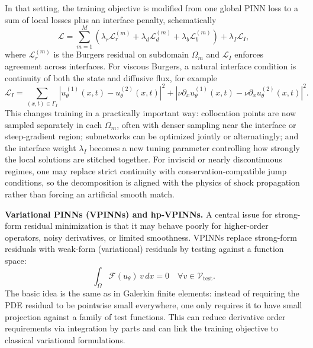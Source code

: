 \documentclass[11pt]{article}
\begin{document}
    In that setting, the training objective is modified from one global PINN loss to a sum of local losses plus an interface penalty, schematically
    \begin{equation}
    \mathcal{L} = \sum_{m=1}^{M}\left(\lambda_r \mathcal{L}_{r}^{(m)} + \lambda_d \mathcal{L}_{d}^{(m)} + \lambda_b \mathcal{L}_{b}^{(m)}\right) + \lambda_I \mathcal{L}_{I},
    \end{equation}
    where $\mathcal{L}_{r}^{(m)}$ is the Burgers residual on subdomain $\Omega_m$ and $\mathcal{L}_{I}$ enforces agreement across interfaces. For viscous Burgers, a natural interface condition is continuity of both the state and diffusive flux, for example
    \begin{equation}
    \mathcal{L}_{I} = \sum_{(x,t)\in \Gamma_I} \left|u_{\theta}^{(1)}(x,t)-u_{\theta}^{(2)}(x,t)\right|^2
    + \left|\nu \partial_x u_{\theta}^{(1)}(x,t)-\nu \partial_x u_{\theta}^{(2)}(x,t)\right|^2.
    \end{equation}
    This changes training in a practically important way: collocation points are now sampled separately in each $\Omega_m$, often with denser sampling near the interface or steep-gradient region; subnetworks can be optimized jointly or alternatingly; and the interface weight $\lambda_I$ becomes a new tuning parameter controlling how strongly the local solutions are stitched together. For inviscid or nearly discontinuous regimes, one may replace strict continuity with conservation-compatible jump conditions, so the decomposition is aligned with the physics of shock propagation rather than forcing an artificial smooth match.

    \textbf{Variational PINNs (VPINNs) and hp-VPINNs.} A central issue for strong-form residual minimization is that it may behave poorly for higher-order operators, noisy derivatives, or limited smoothness. VPINNs replace strong-form residuals with weak-form (variational) residuals by testing against a function space:
    \begin{equation}
    \int_{\Omega} \mathcal{F}(u_\theta)\, v \, dx = 0 \quad \forall v \in \mathcal{V}_{\text{test}}.
    \end{equation}
    The basic idea is the same as in Galerkin finite elements: instead of requiring the PDE residual to be pointwise small everywhere, one only requires it to have small projection against a family of test functions. This can reduce derivative order requirements via integration by parts and can link the training objective to classical variational formulations.
\end{document}
